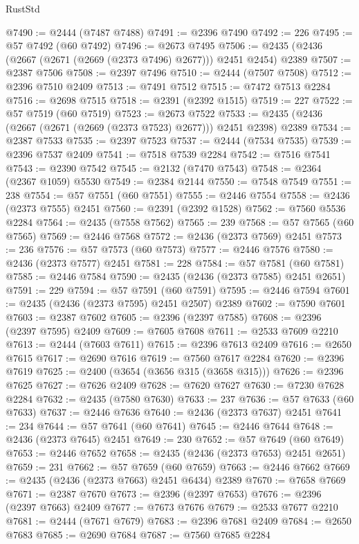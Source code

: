 \begin{lexlean}{RustStd}
\begin{coremodule}
@7490 := @2444 (@7487 @7488)
@7491 := @2396 @7490
@7492 := 226
@7495 := @57 @7492 (@60 @7492)
@7496 := @2673 @7495
@7506 := @2435 (@2436 (@2667 (@2671 (@2669 (@2373 @7496) @2677))) @2451 @2454) @2389
@7507 := @2387 @7506
@7508 := @2397 @7496
@7510 := @2444 (@7507 @7508)
@7512 := @2396 @7510 @2409
@7513 := @7491 @7512
@7515 := @7472 @7513 @2284
@7516 := @2698 @7515
@7518 := @2391 (@2392 @1515)
@7519 := 227
@7522 := @57 @7519 (@60 @7519)
@7523 := @2673 @7522
@7533 := @2435 (@2436 (@2667 (@2671 (@2669 (@2373 @7523) @2677))) @2451 @2398) @2389
@7534 := @2387 @7533
@7535 := @2397 @7523
@7537 := @2444 (@7534 @7535)
@7539 := @2396 @7537 @2409
@7541 := @7518 @7539 @2284
@7542 := @7516 @7541
@7543 := @2390 @7542
@7545 := @2132 (@7470 @7543)
@7548 := @2364 (@2367 @1059) @5530
@7549 := @2384 @2144
@7550 := @7548 @7549
@7551 := 238
@7554 := @57 @7551 (@60 @7551)
@7555 := @2446 @7554
@7558 := @2436 (@2373 @7555) @2451
@7560 := @2391 (@2392 @1528)
@7562 := @7560 @5536 @2284
@7564 := @2435 (@7558 @7562)
@7565 := 239
@7568 := @57 @7565 (@60 @7565)
@7569 := @2446 @7568
@7572 := @2436 (@2373 @7569) @2451
@7573 := 236
@7576 := @57 @7573 (@60 @7573)
@7577 := @2446 @7576
@7580 := @2436 (@2373 @7577) @2451
@7581 := 228
@7584 := @57 @7581 (@60 @7581)
@7585 := @2446 @7584
@7590 := @2435 (@2436 (@2373 @7585) @2451 @2651)
@7591 := 229
@7594 := @57 @7591 (@60 @7591)
@7595 := @2446 @7594
@7601 := @2435 (@2436 (@2373 @7595) @2451 @2507) @2389
@7602 := @7590 @7601
@7603 := @2387 @7602
@7605 := @2396 (@2397 @7585)
@7608 := @2396 (@2397 @7595) @2409
@7609 := @7605 @7608
@7611 := @2533 @7609 @2210
@7613 := @2444 (@7603 @7611)
@7615 := @2396 @7613 @2409
@7616 := @2650 @7615
@7617 := @2690 @7616
@7619 := @7560 @7617 @2284
@7620 := @2396 @7619
@7625 := @2400 (@3654 (@3656 @315 (@3658 @315)))
@7626 := @2396 @7625
@7627 := @7626 @2409
@7628 := @7620 @7627
@7630 := @7230 @7628 @2284
@7632 := @2435 (@7580 @7630)
@7633 := 237
@7636 := @57 @7633 (@60 @7633)
@7637 := @2446 @7636
@7640 := @2436 (@2373 @7637) @2451
@7641 := 234
@7644 := @57 @7641 (@60 @7641)
@7645 := @2446 @7644
@7648 := @2436 (@2373 @7645) @2451
@7649 := 230
@7652 := @57 @7649 (@60 @7649)
@7653 := @2446 @7652
@7658 := @2435 (@2436 (@2373 @7653) @2451 @2651)
@7659 := 231
@7662 := @57 @7659 (@60 @7659)
@7663 := @2446 @7662
@7669 := @2435 (@2436 (@2373 @7663) @2451 @6434) @2389
@7670 := @7658 @7669
@7671 := @2387 @7670
@7673 := @2396 (@2397 @7653)
@7676 := @2396 (@2397 @7663) @2409
@7677 := @7673 @7676
@7679 := @2533 @7677 @2210
@7681 := @2444 (@7671 @7679)
@7683 := @2396 @7681 @2409
@7684 := @2650 @7683
@7685 := @2690 @7684
@7687 := @7560 @7685 @2284

\end{coremodule}
\end{lexlean}
